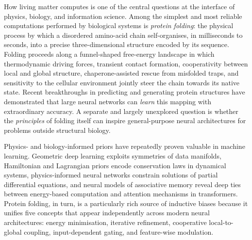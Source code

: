 \documentclass[fleqn,10pt]{article}
\begin{document}
How living matter computes is one of the central questions at the
interface of physics, biology, and
information science.\cite{hopfield1982,anfinsen1973} Among the
simplest and most reliable computations performed by biological
systems is \emph{protein folding}: the physical process by which a
disordered amino-acid chain self-organises, in milliseconds to
seconds, into a precise three-dimensional structure encoded by its
sequence.\cite{anfinsen1973,dill2012protein} Folding proceeds along
a funnel-shaped free-energy landscape in which thermodynamic driving
forces, transient contact formation, cooperativity between local and
global structure, chaperone-assisted rescue from misfolded traps, and
sensitivity to the cellular environment jointly steer the chain
towards its native
state.\cite{dill2012protein,hartl2011molecular,karplus1994folding}
Recent breakthroughs in predicting\cite{jumper2021alphafold,
baek2021accurate, lin2023evolutionary} and
generating\cite{bose2024se3stochastic} protein structures have
demonstrated that large neural networks can \emph{learn} this mapping
with extraordinary accuracy. A separate and largely unexplored
question is whether the \emph{principles} of folding itself can
inspire general-purpose neural architectures for problems outside
structural biology.

Physics- and biology-informed priors have repeatedly proven valuable
in machine learning. Geometric deep learning exploits symmetries of
data manifolds,\cite{bronstein2021geometric} Hamiltonian and
Lagrangian priors encode conservation laws in dynamical
systems,\cite{chen2018neural,greydanus2019hamiltonian} physics-informed
neural networks constrain solutions of partial differential
equations,\cite{karniadakis2021physics} and neural models of
associative memory reveal deep ties between energy-based computation
and attention mechanisms in transformers.\cite{ramsauer2020hopfield}
Protein folding, in turn, is a particularly rich source of inductive
biases because it unifies five concepts that appear independently
across modern neural architectures: energy
minimisation,\cite{lecun2006tutorial,du2019implicit}
iterative refinement,\cite{dehghani2019universal,bai2019deep}
cooperative local-to-global coupling,\cite{chollet2017xception}
input-dependent gating,\cite{shazeer2017outrageously,fedus2022switch}
and feature-wise modulation.\cite{perez2018film}
\end{document}
